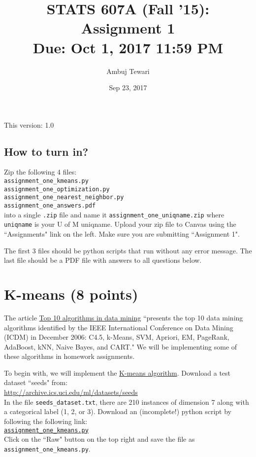 \documentclass{article}
\begin{document}
\author{Ambuj Tewari}
\title{STATS 607A (Fall '15): Assignment 1\\
Due: Oct 1, 2017 11:59 PM}
\date{Sep 23, 2017}

\maketitle

\begin{center}
This version: 1.0
\end{center}

\subsection*{How to turn in?}

Zip the following 4 files:\\
{\tt assignment\_one\_kmeans.py} \\
{\tt assignment\_one\_optimization.py} \\
{\tt assignment\_one\_nearest\_neighbor.py} \\
{\tt assignment\_one\_answers.pdf} \\
into a single {\tt .zip} file and name it {\tt assignment\_one\_uniqname.zip} where {\tt uniqname} is your U of M uniqname. Upload your zip file to Canvas using the ``Assignments" link on the left. Make sure
 you are submitting ``Assignment 1".

The first 3 files should be python scripts that run without any error message. The last file should be a PDF file with answers to all questions below. 

\section{K-means (8 points)}

The article \href{http://link.springer.com/article/10.1007\%2Fs10115-007-0114-2}{Top 10 algorithms in data mining} ``presents the top 10 data mining algorithms identified by the IEEE International
Conference on Data Mining (ICDM) in December 2006: C4.5, k-Means, SVM, Apriori, EM, PageRank, AdaBoost, kNN, Naive Bayes, and CART." We will be implementing some of these
algorithms in homework assignments.

To begin with, we will implement the \href{http://en.wikipedia.org/wiki/K-means_clustering\#Standard_algorithm}{K-means algorithm}. Download a test dataset ``seeds" from:\\
\url{http://archive.ics.uci.edu/ml/datasets/seeds} \\
In the file {\tt seeds\_dataset.txt}, there are 210 instances of dimension 7 along with a categorical label (1, 2, or 3). Download an (incomplete!) python script by following the following
link:\\
\href{https://github.com/ambujtewari/stats607a-fall2017/blob/master/homeworks/assignment_one_kmeans.py}{\tt assignment\_one\_kmeans.py} \\
Click on the ``Raw" button on the top right and save the file as {\tt assignment\_one\_kmeans.py}.
\end{document}

